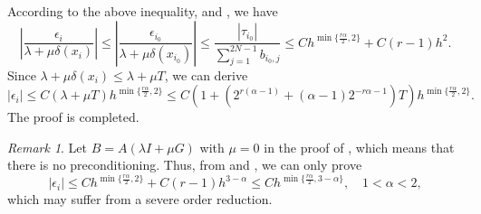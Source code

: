 \documentclass{amsart}
\theoremstyle{definition}
\theoremstyle{remark}
\newtheorem{remark}[theorem]{Remark}
\numberwithin{equation}{section}
\begin{document}
According to the above inequality,  and , we have
\begin{equation*}
  \left|\frac{\epsilon_{i}}{\lambda + \mu \delta(x_{i})}\right| \le \left|\frac{\epsilon_{i_0}}{\lambda + \mu \delta(x_{i_0})}\right| 
  \le \frac{|\tau_{i_0}|}{\sum_{j=1}^{2N-1} b_{i_0, j}}
  \le C h^{\min\{\frac{r\alpha}{2}, 2\}} + C (r-1) h^2 .
\end{equation*}
Since \(\lambda + \mu\delta(x_{i}) \le \lambda + \mu T \), we can derive
\begin{equation*}
  |\epsilon_i| \le C(\lambda + \mu T) h^{\min\{\frac{r\alpha}{2}, 2\}}
  \le C \left(1+ (2^{r(\alpha-1)} + (\alpha-1) 2^{-r\alpha-1}) T \right) h^{\min\{\frac{r\alpha}{2}, 2\}}.
\end{equation*}
The proof is completed.

\begin{remark}
    Let $B=A (\lambda I + \mu G)$ with $\mu=0$ in the proof of , which means that there is no preconditioning.
    Thus, from  and ,
    we can only prove
    $$ |\epsilon_i| \le C h^{\min\{\frac{r\alpha}{2}, 2\}} + C(r-1) h^{3-\alpha} \le C h^{\min\{\frac{r\alpha}{2}, 3-\alpha\}}, \quad 1<\alpha <2, $$
    which may suffer from a severe order reduction.
\end{remark}
\end{document}
